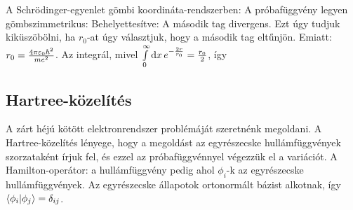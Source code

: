    A Schrödinger-egyenlet gömbi koordináta-rendszerben:
   A próbafüggvény legyen gömbszimmetrikus:
   Behelyettesítve:
   A második tag divergens. Ezt úgy tudjuk kiküszöbölni, ha $r_0$-at úgy választjuk, hogy a második tag eltűnjön. Emiatt: $r_0=\frac{4\pi\varepsilon_0\hbar^2}{me^2}$. Az integrál, mivel $\int\limits_{0}^{\infty}\mathrm{d} x\,e^{-\frac{2r}{r_0}}=\frac{r_0}{2}$, így
   
  \subsection{Hartree-közelítés}\label{ss:10-Hartree}
   
   A zárt héjú kötött elektronrendszer problémáját szeretnénk megoldani. A Hartree-közelítés lényege, hogy a megoldást az egyrészecske hullámfüggvények szorzataként írjuk fel, és ezzel az próbafüggvénnyel végezzük el a variációt. A Hamilton-operátor:
   a hullámfüggvény pedig 
   ahol $\phi_i$-k az egyrészecske hullámfüggvények. Az egyrészecske állapotok ortonormált bázist alkotnak, így $\langle\phi_i\rvert\phi_j\rangle=\delta_{ij}$.
   

